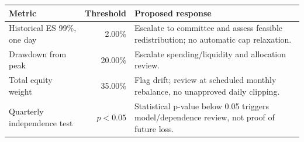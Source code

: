 \begin{tabular}{@{}p{}rp{}@{}}
\toprule
Metric & Threshold & Proposed response \\
\midrule
Historical ES 99\%, one day & 2.00\% & Escalate to committee and assess feasible redistribution; no automatic cap relaxation. \\
Drawdown from peak & 20.00\% & Escalate spending/liquidity and allocation review. \\
Total equity weight & 35.00\% & Flag drift; review at scheduled monthly rebalance, no unapproved daily clipping. \\
Quarterly independence test & $p<0.05$ & Statistical p-value below 0.05 triggers model/dependence review, not proof of future loss. \\
\bottomrule
\end{tabular}
